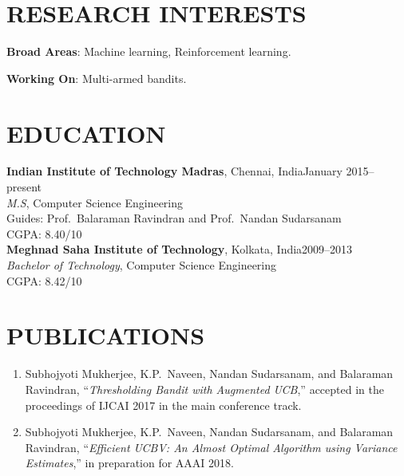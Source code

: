 \documentclass[margin,11pt]{res}
\begin{document}
\begin{resume}

\section{RESEARCH INTERESTS}
\textbf{Broad Areas}: Machine learning, Reinforcement learning.

\par
\textbf{Working On}: Multi-armed bandits.


\section{EDUCATION}
\textbf{Indian Institute of Technology Madras}, Chennai, India\hfill January 2015--present\\
{\sl M.S}, Computer Science Engineering
\\Guides: Prof.~Balaraman Ravindran and Prof.~Nandan Sudarsanam\\CGPA: 8.40/10
\\[0.25cm]
\textbf{Meghnad Saha Institute of Technology}, Kolkata, India\hfill 2009--2013\\
{\sl Bachelor of Technology}, Computer Science Engineering\\ CGPA: 8.42/10
\section{PUBLICATIONS}
\begin{enumerate}[leftmargin=*]
\item Subhojyoti Mukherjee, K.P.~Naveen, Nandan Sudarsanam, and Balaraman Ravindran, ``\textit{Thresholding Bandit with Augmented UCB},'' accepted in the proceedings of IJCAI 2017 in the main conference track.
\item Subhojyoti Mukherjee, K.P.~Naveen, Nandan Sudarsanam, and Balaraman Ravindran, ``\textit{Efficient UCBV: An Almost Optimal Algorithm using Variance Estimates},'' in preparation for AAAI 2018.
\end{enumerate}


\end{resume}
\end{document}
